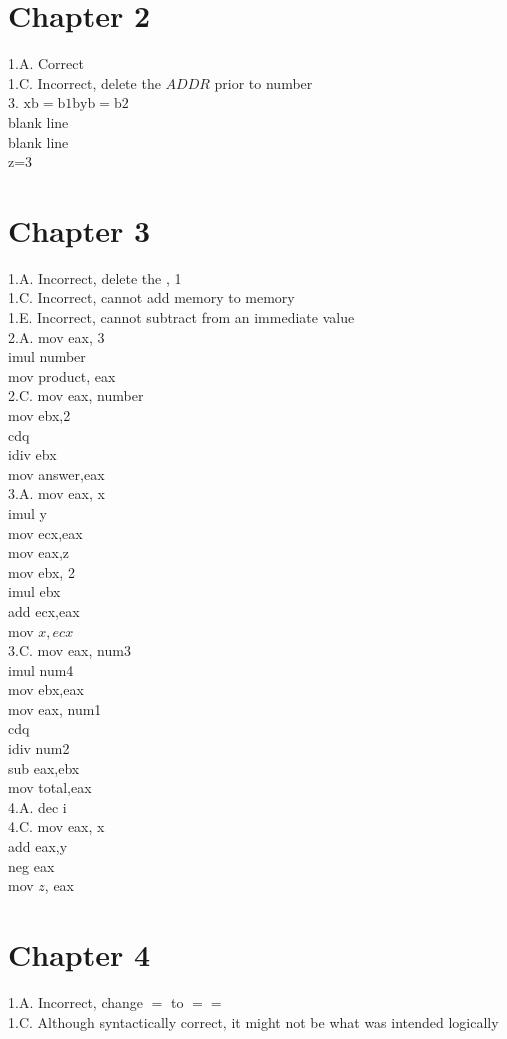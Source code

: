 \documentclass[10pt]{book}
\begin{document}
\section*{Chapter 2}
1.A. Correct\\
1.C. Incorrect, delete the $A D D R$ prior to number\\
3. $\mathrm{xb}=\mathrm{b} 1 \mathrm{byb}=\mathrm{b} 2$\\
blank line\\
blank line\\
z=3

\section*{Chapter 3}
1.A. Incorrect, delete the , 1\\
1.C. Incorrect, cannot add memory to memory\\
1.E. Incorrect, cannot subtract from an immediate value\\
2.A. mov eax, 3\\
imul number\\
mov product, eax\\
2.C. mov eax, number\\
mov ebx,2\\
cdq\\
idiv ebx\\
mov answer,eax\\
3.A. mov eax, x\\
imul y\\
mov ecx,eax\\
mov eax,z\\
mov ebx, 2\\
imul ebx\\
add ecx,eax\\
mov $x, e c x$\\
3.C. mov eax, num3\\
imul num4\\
mov ebx,eax\\
mov eax, num1\\
cdq\\
idiv num2\\
sub eax,ebx\\
mov total,eax\\
4.A. dec i\\
4.C. mov eax, x\\
add eax,y\\
neg eax\\
mov $z$, eax

\section*{Chapter 4}
1.A. Incorrect, change $=$ to $==$\\
1.C. Although syntactically correct, it might not be what was intended logically
\end{document}
